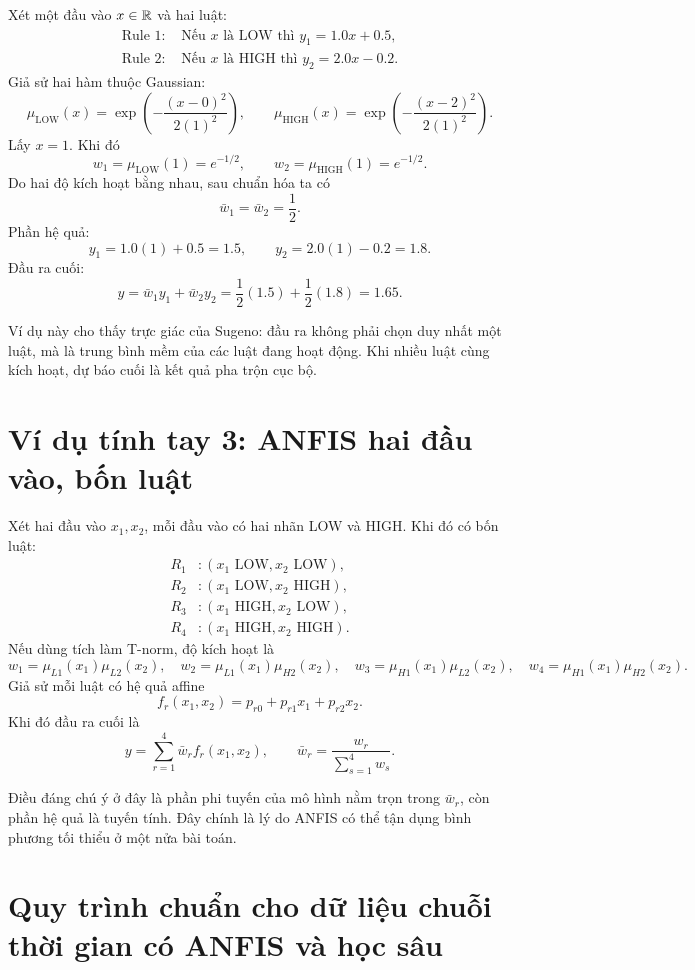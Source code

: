 Xét một đầu vào \(x\in\mathbb{R}\) và hai luật:
\begin{align*}
\text{Rule 1: } & \text{Nếu } x \text{ là LOW thì } y_1 = 1.0x + 0.5,\\
\text{Rule 2: } & \text{Nếu } x \text{ là HIGH thì } y_2 = 2.0x - 0.2.
\end{align*}
Giả sử hai hàm thuộc Gaussian:
\[
\mu_{\mathrm{LOW}}(x)=\exp\left(-\frac{(x-0)^2}{2(1)^2}\right),
\qquad
\mu_{\mathrm{HIGH}}(x)=\exp\left(-\frac{(x-2)^2}{2(1)^2}\right).
\]
Lấy \(x=1\). Khi đó
\[
w_1=\mu_{\mathrm{LOW}}(1)=e^{-1/2},
\qquad
w_2=\mu_{\mathrm{HIGH}}(1)=e^{-1/2}.
\]
Do hai độ kích hoạt bằng nhau, sau chuẩn hóa ta có
\[
\bar{w}_1=\bar{w}_2=\frac{1}{2}.
\]
Phần hệ quả:
\[
y_1 = 1.0(1)+0.5=1.5,
\qquad
y_2 = 2.0(1)-0.2=1.8.
\]
Đầu ra cuối:
\[
y = \bar{w}_1 y_1 + \bar{w}_2 y_2 = \frac{1}{2}(1.5)+\frac{1}{2}(1.8)=1.65.
\]

Ví dụ này cho thấy trực giác của Sugeno: đầu ra không phải chọn duy nhất một luật, mà là trung bình mềm của các luật đang hoạt động. Khi nhiều luật cùng kích hoạt, dự báo cuối là kết quả pha trộn cục bộ.

\section{Ví dụ tính tay 3: ANFIS hai đầu vào, bốn luật}

Xét hai đầu vào \(x_1,x_2\), mỗi đầu vào có hai nhãn LOW và HIGH. Khi đó có bốn luật:
\begin{align*}
R_1 &: (x_1 \text{ LOW}, x_2 \text{ LOW}),\\
R_2 &: (x_1 \text{ LOW}, x_2 \text{ HIGH}),\\
R_3 &: (x_1 \text{ HIGH}, x_2 \text{ LOW}),\\
R_4 &: (x_1 \text{ HIGH}, x_2 \text{ HIGH}).
\end{align*}
Nếu dùng tích làm T-norm, độ kích hoạt là
\[
w_1=\mu_{L1}(x_1)\mu_{L2}(x_2),\quad
w_2=\mu_{L1}(x_1)\mu_{H2}(x_2),\quad
w_3=\mu_{H1}(x_1)\mu_{L2}(x_2),\quad
w_4=\mu_{H1}(x_1)\mu_{H2}(x_2).
\]
Giả sử mỗi luật có hệ quả affine
\[
f_r(x_1,x_2)=p_{r0}+p_{r1}x_1+p_{r2}x_2.
\]
Khi đó đầu ra cuối là
\[
y=\sum_{r=1}^4 \bar{w}_r f_r(x_1,x_2),
\qquad
\bar{w}_r=\frac{w_r}{\sum_{s=1}^4 w_s}.
\]

Điều đáng chú ý ở đây là phần phi tuyến của mô hình nằm trọn trong \(\bar{w}_r\), còn phần hệ quả là tuyến tính. Đây chính là lý do ANFIS có thể tận dụng bình phương tối thiểu ở một nửa bài toán.

\section{Quy trình chuẩn cho dữ liệu chuỗi thời gian có ANFIS và học sâu}

